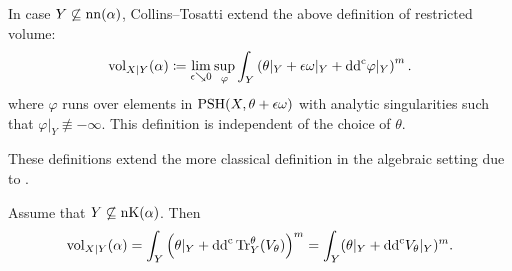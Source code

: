In case $Y\not\subseteq \operatorname{nn}(\alpha)$, Collins--Tosatti \cite{CT22} extend the above definition of restricted volume:
\begin{equation}\label{eq:rest_vol_CT_def}
        \operatorname{vol}_{X|Y}(\alpha)\coloneqq \lim_{\epsilon \searrow 0}\sup_{\varphi} \int_Y \left(\theta|_Y + \epsilon \omega|_Y +\mathrm{dd}^{\mathrm{c}} \varphi|_Y\right)^m.
\end{equation}
where $\varphi$ runs over elements in $\mathrm{PSH}(X,\theta+\epsilon\omega)$ with analytic singularities such that $\varphi|_Y\not\equiv -\infty$. This definition is independent of the choice of $\theta$.

These definitions extend the more classical definition in the algebraic setting due to \cite{ELMNP09}.

\begin{proposition}\label{prop:restvol_voltrace}
Assume that $Y\not\subseteq \operatorname{nK}(\alpha)$. Then
    \begin{equation}\label{eq:volrest}
        \operatorname{vol}_{X|Y}(\alpha)= \int_Y \left( \theta|_Y+\mathrm{dd}^{\mathrm{c}} \operatorname{Tr}_Y^{\theta}(V_{\theta}) \right)^m =\int_Y (\theta|_Y + \mathrm{dd}^{\mathrm{c}} V_\theta|_Y)^m.
    \end{equation}
\end{proposition}

